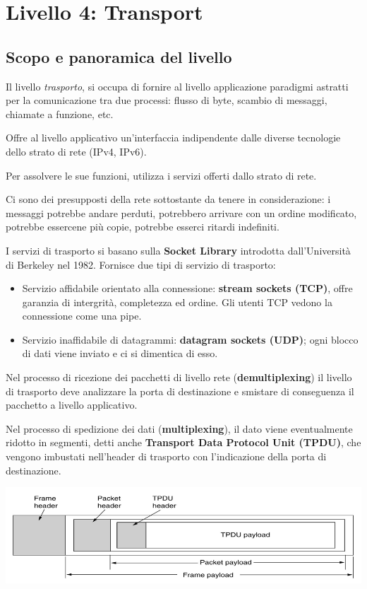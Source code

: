 \section{Livello 4: Transport}
    \subsection{Scopo e panoramica del livello}
        Il livello \textit{trasporto}, si occupa di fornire al livello applicazione paradigmi astratti per la comunicazione tra due processi: flusso di byte, scambio di messaggi, chiamate a funzione, etc.

        Offre al livello applicativo un'interfaccia indipendente dalle diverse tecnologie dello strato di rete (IPv4, IPv6).

        Per assolvere le sue funzioni, utilizza i servizi offerti dallo strato di rete.

        Ci sono dei presupposti della rete sottostante da tenere in considerazione: i messaggi potrebbe andare perduti, potrebbero arrivare con un ordine modificato, potrebbe essercene più copie, potrebbe esserci ritardi indefiniti.

        I servizi di trasporto si basano sulla \textbf{Socket Library} introdotta dall'Università di Berkeley nel 1982. Fornisce due tipi di servizio di trasporto:
        \begin{itemize}
            \item Servizio affidabile orientato alla connessione: \textbf{stream sockets (TCP)}, offre garanzia di intergrità, completezza ed ordine. Gli utenti TCP vedono la connessione come una pipe.
            \item Servizio inaffidabile di datagrammi: \textbf{datagram sockets (UDP)}; ogni blocco di dati viene inviato e ci si dimentica di esso.
        \end{itemize}

        Nel processo di ricezione dei pacchetti di livello rete (\textbf{demultiplexing}) il livello di trasporto deve analizzare la porta di destinazione e smistare di conseguenza il pacchetto a livello applicativo.

        Nel processo di spedizione dei dati (\textbf{multiplexing}), il dato viene eventualmente ridotto in segmenti, detti anche \textbf{Transport Data Protocol Unit (TPDU)}, che vengono imbustati nell'header di trasporto con l'indicazione della porta di destinazione.

        \begin{center}
            \includegraphics[scale=0.36]{chapters/5/assets/schema_a.png}
        \end{center}

